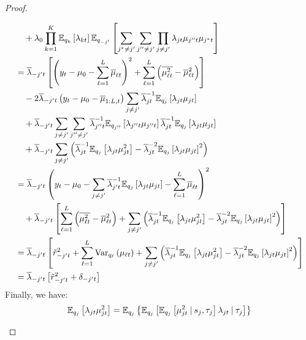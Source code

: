 \begin{proof}
\begin{enumerate}[label=\roman*.]
\begin{align*}
    &\quad + \lambda_0 \prod_{k=1}^K \mathbb{E}_{q_{k}}\left[ \lambda_{kt}\right]\mathbb{E}_{q_{-j'}}\left[\sum_{j^*\neq j'}\sum_{j''\neq j'}  \prod_{j \neq j'} \lambda_{jt} \mu_{j''t} \mu_{j^*t}\right] \\
    &= \overline{\lambda}_{-j't}\left[\left(y_t - \mu_0 - \sum_{\ell=1}^L \overline{\mu}_{\ell t}\right)^2 + \sum_{\ell=1}^L \left(\overline{\mu^2_{\ell t}} - \overline{\mu}^2_{\ell t} \right) \right] \\
    &\quad -2  \overline{\lambda}_{-j't}\left(y_t - \mu_0  - \overline{\mu}_{1:L, t}\right) \sum_{j\neq j'} \overline{\lambda}_{jt}^{-1} \mathbb{E}_{q_{j}}\left[\lambda_{jt} \mu_{jt}\right] \\
    &\quad + \overline{\lambda}_{-j't} \sum_{j\neq j'}\sum_{j''\neq j'} \overline{\lambda}_{j''t}^{-1}\mathbb{E}_{q_{j''}}\left[\lambda_{j''t} \mu_{j''t}\right]\overline{\lambda}_{jt}^{-1}\mathbb{E}_{q_{j}}\left[ \lambda_{jt}\mu_{jt}\right] \\
    &\quad + \overline{\lambda}_{-j't} \sum_{j\neq j'}\left(\overline{\lambda}_{jt}^{-1}\mathbb{E}_{q_{j}}\left[ \lambda_{jt}\mu_{jt}^2\right] -\overline{\lambda}_{jt}^{-2}\mathbb{E}_{q_{j}}\left[ \lambda_{jt}\mu_{jt}\right]^2\right) \\
    &=  \overline{\lambda}_{-j't}\left(y_t - \mu_0 - \sum_{j\neq j'} \overline{\lambda}_{j't}^{-1} \mathbb{E}_{q_{j}}\left[\lambda_{jt} \mu_{jt}\right] - \sum_{\ell=1}^L \overline{\mu}_{\ell t}\right)^2 \\
    &\quad + \overline{\lambda}_{-j't}\left[\sum_{\ell=1}^L \left(\overline{\mu^2_{\ell t}} - \overline{\mu}^2_{\ell t} \right) + \sum_{j\neq j'}\left(\overline{\lambda}_{jt}^{-1}\mathbb{E}_{q_{j}}\left[ \lambda_{jt}\mu_{jt}^2\right] -\overline{\lambda}_{jt}^{-2}\mathbb{E}_{q_{j}}\left[ \lambda_{jt}\mu_{jt}\right]^2\right)\right] \\
    &= \overline{\lambda}_{-j't}\left[\tilde{r}^2_{-j' t} +\sum_{\ell=1}^L \text{\normalfont Var}_{q_\ell} \left(\mu_{\ell t} \right) + \sum_{j\neq j'}\left(\overline{\lambda}_{jt}^{-1}\mathbb{E}_{q_{j}}\left[ \lambda_{jt}\mu_{jt}^2\right] -\overline{\lambda}_{jt}^{-2}\mathbb{E}_{q_{j}}\left[ \lambda_{jt}\mu_{jt}\right]^2\right)\right]\\
    &= \overline{\lambda}_{-j't}\left[\tilde{r}^2_{-j' t} + \delta_{-j't}\right]
\end{align*}
\normalsize
Finally, we have:
\small
\begin{align*}
    \E_{q_{j}}\left[\lambda_{jt}\mu^2_{jt}\right] &= \E_{q_{j}}\left\{\E_{q_{j}}\left[\E_{q_{j}}\left[\mu^2_{jt}\:|\: s_{j}, \tau_{j}\right]\lambda_{jt}\:|\: \tau_{j}\right]\right\} \\

\end{align*}
\end{enumerate}
\end{proof}
